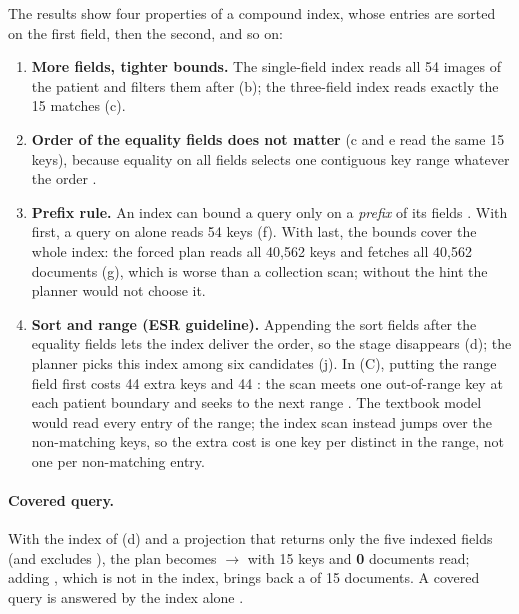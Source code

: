The results show four properties of a compound index, whose entries are sorted on the first field,
then the second, and so on:
\begin{enumerate}
  \item \textbf{More fields, tighter bounds.} The single-field index reads all 54 images of the
        patient and filters them after  (b); the three-field index reads exactly the 15
        matches (c).
  \item \textbf{Order of the equality fields does not matter} (c and e read the same 15 keys),
        because equality on all fields selects one contiguous key range whatever the order
        \cite{mongodb-esr}.
  \item \textbf{Prefix rule.} An index can bound a query only on a \emph{prefix} of its fields
        \cite{mongodb-compound}. With  first, a query on  alone
        reads 54 keys (f). With  last, the bounds cover the whole index: the forced
        plan reads all 40{,}562 keys and fetches all 40{,}562 documents (g), which is worse than a
        collection scan; without the hint the planner would not choose it.
  \item \textbf{Sort and range (ESR guideline).} Appending the sort fields after the equality fields
        lets the index deliver the order, so the  stage disappears (d); the planner picks
        this index among six candidates (j). In (C), putting the range field first costs 44 extra keys
        and 44 : the scan meets one out-of-range key at each patient boundary and seeks to
        the next range \cite{mongodb-explain}. The textbook model would read every entry of the
        range; the index scan instead jumps over the non-matching keys, so the extra cost is one key
        per distinct  in the range, not one per non-matching entry.
\end{enumerate}

\paragraph{Covered query.} With the index of (d) and a projection that returns only the five
indexed fields (and excludes ), the plan becomes  $\rightarrow$  with 15 keys and \textbf{0}
documents read; adding , which is not in the index, brings back a  of 15
documents. A covered query is answered by the index alone \cite{mongodb-covered}.


